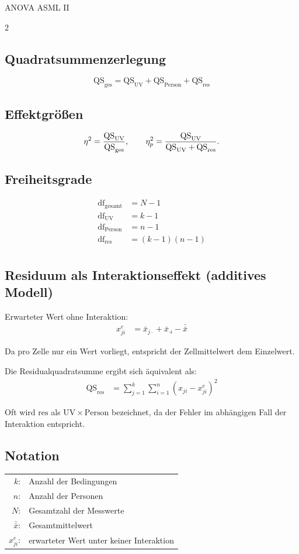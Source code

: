 \begin{formulaBox}{ANOVA AS}{ML II}
\begin{multicols}{2}
\subsection*{Quadratsummenzerlegung}
$$\mathrm{QS}_{\mathrm{ges}}=\mathrm{QS}_{\mathrm{UV}}+ \mathrm{QS}_{\mathrm{Person}}+\mathrm{QS}_{\mathrm{res}}$$
\subsection*{Effektgrößen}
\[
\eta^2=\frac{\mathrm{QS}_{\mathrm{UV}}}{\mathrm{QS}_{\mathrm{ges}}},\qquad
\eta_p^2=\frac{\mathrm{QS}_{\mathrm{UV}}}{\mathrm{QS}_{\mathrm{UV}}+\mathrm{QS}_{\mathrm{res}}}.
\]

\subsection*{Freiheitsgrade} 
\begin{align*} 
\mathrm{df}_{\mathrm{gesamt}} &= N-1 \\
\mathrm{df}_{\mathrm{UV}} &= k-1 \\
\mathrm{df}_{\mathrm{Person}} &= n-1 \\
\mathrm{df}_{\mathrm{res}} &= (k-1)(n-1) \\
\end{align*}

\subsection*{Residuum als Interaktionseffekt (additives Modell)}
Erwarteter Wert ohne Interaktion:
\begin{align*}
x_{ji}^{e} 
&= \bar{x}_{j\cdot} + \bar{x}_{\cdot i} - \bar{\bar{x}}
\end{align*}

Da pro Zelle nur ein Wert vorliegt, entspricht der Zellmittelwert dem Einzelwert.

Die Residualquadratsumme ergibt sich äquivalent als:
\begin{align*}
\mathrm{QS}_{\mathrm{res}} 
&= \sum_{j=1}^k \sum_{i=1}^n 
\left(x_{ji} - x_{ji}^{e}\right)^2
\end{align*}

Oft wird $\mathrm{res}$ als $\mathrm{UV} \times \mathrm{Person}$ bezeichnet, da der Fehler im abhängigen Fall der Interaktion entspricht.

\subsection*{Notation}

\begin{tabular}{rl}
$k$: & Anzahl der Bedingungen \\
$n$: & Anzahl der Personen \\
$N$: & Gesamtzahl der Messwerte \\
$\bar{\bar{x}}$: & Gesamtmittelwert\\
$x_{ji}^{e}$: & erwarteter Wert unter keiner Interaktion\\
\end{tabular}
\end{multicols}
\end{formulaBox}
